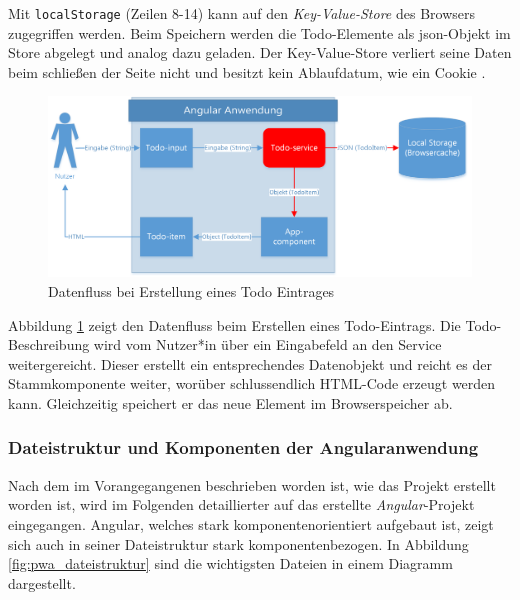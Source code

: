 Mit \texttt{localStorage} (Zeilen 8-14) kann auf den\textit{ Key-Value-Store} des Browsers zugegriffen werden. Beim Speichern werden die Todo-Elemente als \ac{json}-Objekt im Store abgelegt und analog dazu geladen. Der Key-Value-Store verliert seine Daten beim schließen der Seite nicht und besitzt kein Ablaufdatum, wie ein Cookie \cite{LocalStorage}.

\begin{figure}[h]
	\includegraphics[width=\textwidth]{img/pwa_datenfluss_erstellen.png}
	\centering
	\caption{Datenfluss bei Erstellung eines Todo Eintrages}
	\label{fig:pwa_datenfluss_erstellen}
\end{figure}

Abbildung \ref{fig:pwa_datenfluss_erstellen} zeigt den Datenfluss beim Erstellen eines Todo-Eintrags. Die Todo-Beschreibung wird vom Nutzer*in über ein Eingabefeld an den Service weitergereicht. Dieser erstellt ein entsprechendes Datenobjekt und reicht es der Stammkomponente weiter, worüber schlussendlich HTML-Code erzeugt werden kann. Gleichzeitig speichert er das neue Element im Browserspeicher ab.

\subsubsection{Dateistruktur und Komponenten der Angularanwendung}
Nach dem im Vorangegangenen beschrieben worden ist, wie das Projekt erstellt worden ist, wird im Folgenden detaillierter auf das erstellte \textit{Angular}-Projekt eingegangen. Angular, welches stark komponentenorientiert aufgebaut ist, zeigt sich auch in seiner Dateistruktur stark komponentenbezogen. In Abbildung \ref{fig:pwa_dateistruktur} sind die wichtigsten Dateien in einem Diagramm dargestellt.

